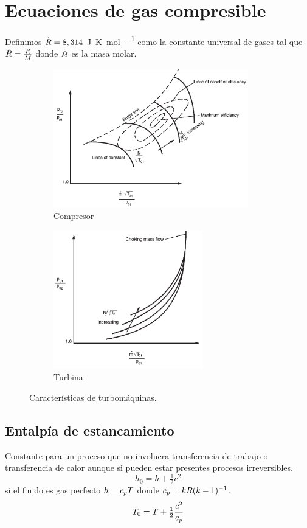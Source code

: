 \documentclass{article}
\begin{document}
\section{Ecuaciones de gas compresible}
Definimos $\tilde{R}=8,314$ \si{\joule \per \kelvin\per \mole} como la constante universal de gases tal que $\tilde{R} = \frac{R}{{\scriptstyle \bar{M}}}$ donde ${\scriptstyle \bar{M}}$ es la masa molar.
\begin{figure}[htb!]
\centering
\begin{subfigure}{.49\textwidth}
\centering
\includegraphics[height=6cm]{fig/caracteristicascompresor.png}
\caption{Compresor}
\label{fig:caractcompresor}
\end{subfigure}%
\begin{subfigure}{.49\textwidth}
\centering
\includegraphics[height= 6cm]{fig/caracteristicasturbina.png}
\caption{Turbina}
\label{fig:caractturbina}
\end{subfigure}
\caption{Características de turbomáquinas.}
\label{fig:caracteristicasturbomaquinas}
\end{figure}
\subsection{Entalpía de estancamiento} 
Constante para un proceso que no involucra transferencia de trabajo o transferencia de calor aunque si pueden estar presentes procesos irreversibles.
\[
h_0 = h+\tfrac{1}{2}c^2
\]
si el fluido es gas perfecto \( h=c_p T\) donde \( c_p = k R (k-1)^{-1} \).
\[
T_0 = T + \tfrac{1}{2}\frac{c^2}{c_p}
\]
\end{document}
